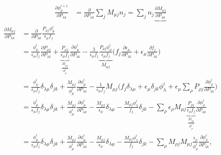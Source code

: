 \begin{align*}
	\frac{\partial \phi^{i+1}_{\mu}}{\partial P_{\lambda k}} 
	&= \frac{\partial}{\partial P_{\lambda k}} \sum_{j}{M_{\mu j} n_{j}}
	= \sum_{j} { n_{j} \underbrace{\frac{\partial M_{\mu j}}{\partial P_{\lambda k}} } }
\end{align*}
\begin{align*}
	\frac{\partial M_{\mu j}}{\partial P_{\lambda k}}
	&= \frac{\partial}{\partial P_{\lambda k}} \frac{ P_{\mu j} \phi^{i}_{\mu} }{ \epsilon_{\mu} f_{j}} \\
	&= \frac{\phi^{i}_{\mu} }{ \epsilon_{\mu} f_{j}} \frac{\partial P_{\mu j}}{\partial P_{\lambda k}}
	+ \underbrace{ \frac{P_{\mu j}}{\epsilon_{\mu} f_{j}} }_{\frac{M_{\mu j}}{\phi^{i}_{\mu}} } \frac{\partial \phi^{i}_{\mu}}{\partial P_{\lambda k}}
	- \frac{1}{\epsilon_{\mu} f_{j}} \underbrace{\frac{P_{\mu j} \phi^{i}_{\mu}}{\epsilon_{\mu} f_{j}}}_{M_{\mu j}}
	\bigg( f_{j} \frac{\partial \epsilon_{\mu}}{\partial P_{\lambda k}} + \epsilon_{\mu} \frac{\partial f_{j}}{\partial P_{\lambda k}}\bigg)
	\\
	&= \frac {\phi^{i}_{\mu} }{\epsilon_{\mu} f_{j}} \delta _{\lambda \mu} \delta_{jk}
	+ \frac{M_{\mu j}}{\phi^{i}_{\mu}} \frac{\partial \phi^{i}_{\mu}}{\partial P_{\lambda k}}
	- \frac{1}{\epsilon_{\mu} f_{j}} M_{\mu j} \bigg( f_{j} \delta_{\lambda \mu} 
	+ \epsilon_{\mu}\delta_{jk} \phi^{i}_{\lambda} + \epsilon_{\mu} \sum_{\rho} {P_{\rho j} \frac{\partial \phi^{i}_{\rho}}{\partial P_{\lambda k}}}\bigg)
	\\
	&= \frac {\phi^{i}_{\mu} }{\epsilon_{\mu} f_{j}} \delta _{\lambda \mu} \delta_{jk}
	+ \frac{M_{\mu j}}{\phi^{i}_{\mu}} \frac{\partial \phi^{i}_{\mu}}{\partial P_{\lambda k}}
	- \frac{M_{\mu j}}{\epsilon_{\mu}} \delta_{\lambda \mu}
	- \frac{M_{\mu j} \phi^{i}_{\lambda}}{f_{j}} \delta_{jk}
	- \sum_{\rho}{\epsilon_{\rho} M_{\mu j} \underbrace{\frac{P_{\rho j}}{\epsilon_{\rho} f_{j}}}_{\frac{M_{\rho j}}{\phi^{i}_{\rho}}} \frac{\partial \phi^{i}_{\rho}}{\partial P_{\lambda k}}}
	\\
	&= \frac {\phi^{i}_{\mu} }{\epsilon_{\mu} f_{j}} \delta _{\lambda \mu} \delta_{jk}
	+ \frac{M_{\mu j}}{\phi^{i}_{\mu}} \frac{\partial \phi^{i}_{\mu}}{\partial P_{\lambda k}}
	- \frac{M_{\mu j}}{\epsilon_{\mu}} \delta_{\lambda \mu}
	- \frac{M_{\mu j} \phi^{i}_{\lambda}}{f_{j}} \delta_{jk}
	- \sum_{\rho} M_{\rho j}M_{\mu j} \frac{\epsilon_{\rho}}{\phi^{i}_{\rho}} \frac{\partial \phi^{i}_{\rho}}{\partial P_{\lambda k}},
\end{align*}

